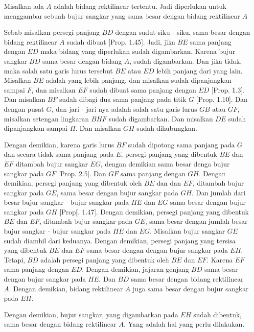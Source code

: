 \documentclass[a4paper]{book}
\begin{document}
Misalkan ada $A$ adalah bidang rektilinear tertentu. Jadi diperlukan untuk
menggambar sebuah bujur sangkar yang sama besar dengan bidang rektilinear
$A$

Sebab misalkan persegi panjang $BD$ dengan sudut siku - siku, sama besar  
dengan bidang rektilinear $A$ sudah dibuat [Prop. 1.45]. Jadi,
jika $BE$  sama panjang dengan $ED$ maka bidang yang diperlukan sudah 
digambarkan. Karena bujur sangkar $BD$ sama besar dengan bidang $A$, sudah
digambarkan. Dan jika tidak, maka salah satu garis lurus tersebut $BE$ 
atau $ED$ lebih panjang dari yang lain. Misalkan $BE$ adalah yang lebih
panjang, dan misalkan sudah dipanjangkan sampai $F$, dan misalkan $EF$ 
sudah dibuat sama panjang dengan $ED$ [Prop. 1.3]. Dan misalkan $BF$ sudah
dibagi dua sama panjang pada titik $G$ [Prop. 1.10]. Dan dengan pusat $G$, 
dan jari - jari nya adalah salah satu garis lurus $GB$ atau $GF$, misalkan
setengan lingkaran $BHF$ sudah digambarkan. Dan misalkan $DE$ sudah 
dipanjangkan sampai $H$. Dan misalkan $GH$ sudah dihubungkan.

Dengan demikian, karena garis lurus $BF$ sudah dipotong sama panjang pada
$G$ dan secara tidak sama panjang pada $E$, persegi panjang yang dibentuk
$BE$ dan $EF$ ditambah bujur sangkar $EG$, dengan demikian sama besar denga
bujur sangkar pada $GF$ [Prop. 2.5]. Dan $GF$ sama panjang dengan $GH$. 
Dengan demikian, persegi panjang yang dibentuk oleh $BE$ dan dan $EF$, 
ditambah bujur sangkar pada $GE$, sama besar dengan bujur sangkar pada
$GH$. Dan jumlah dari besar bujur sangkar - bujur sangkar pada $HE$ dan $EG$
sama besar dengan bujur sangkar pada $GH$ [Prop[. 1.47]. Dengan demikian, 
persegi panjang yang dibentuk $BE$ dan $EF$, ditambah bujur sangkar pada $GE$,
sama besar dengan jumlah besar bujur sangkar - bujur sangkar pada $HE$ dan
$EG$. Misalkan bujur sangkar $GE$ sudah diambil dari keduanya. Dengan demikian, 
persegi panjang yang tersisa yang dibentuk $BE$ dan $EF$ sama besar dengan 
dengan bujur sangkar pada $EH$. Tetapi, $BD$ adalah persegi panjang yang 
dibentuk oleh $BE$ dan $EF$. Karena $EF$ sama panjang dengan $ED$. Dengan 
demikian, jajaran genjang $BD$ sama besar dengan  bujur sangkar pada $HE$.
Dan $BD$ sama besar dengan bidang rektilinear $A$. Dengan demikian, bidang
rektilinear $A$ juga sama besar dengan bujur sangkar pada $EH$.

Dengan demikian, bujur sangkar, yang digambarkan pada $EH$ sudah dibentuk, 
sama besar dengan bidang rektilinear $A$. Yang adalah hal yang perlu dilakukan.  

\end{document}
